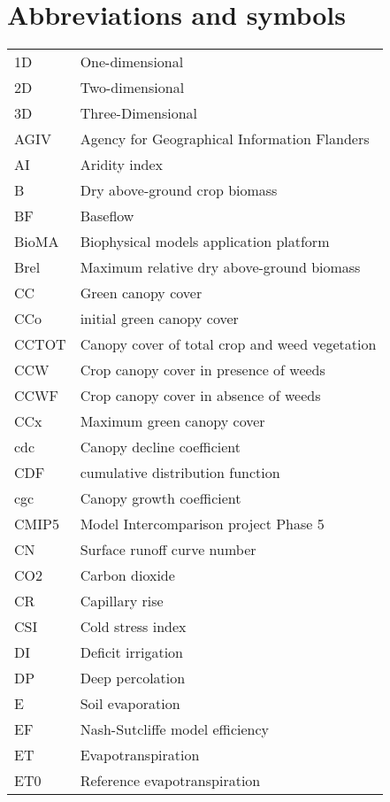\chapter{Abbreviations and symbols}\label{ch:abbreviations}

\begin{tabularx}{\textwidth}{lX}
\small
1D    & One-dimensional \\
2D    & Two-dimensional \\
3D    & Three-Dimensional \\
AGIV  & Agency for Geographical Information Flanders  \\
AI    & Aridity index  \\
B     & Dry above-ground crop biomass \\
BF    & Baseflow \\
BioMA & Biophysical models application platform \\
Brel  & Maximum relative dry above-ground biomass \\
CC    & Green canopy cover \\
CCo   & initial green canopy cover  \\
CCTOT & Canopy cover of total crop and weed vegetation \\
CCW   & Crop canopy cover in presence of weeds \\
CCWF  & Crop canopy cover in absence of weeds \\
CCx   & Maximum green canopy cover  \\
cdc   & Canopy decline coefficient  \\
CDF   & cumulative distribution function \\
cgc   & Canopy growth coefficient \\
CMIP5 & Model Intercomparison project Phase 5 \\
CN    & Surface runoff curve number \\
CO2   & Carbon dioxide \\
CR    & Capillary rise \\
CSI   & Cold stress index \\
DI    & Deficit irrigation  \\
DP    & Deep percolation \\
E     & Soil evaporation  \\
EF    & Nash-Sutcliffe model efficiency \\
ET    & Evapotranspiration \\
ET0   & Reference evapotranspiration \\

\end{tabularx}
